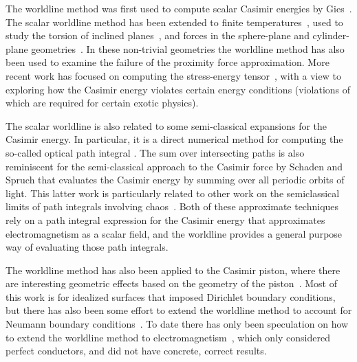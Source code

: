 The worldline method was first used to compute scalar Casimir energies by Gies\etal~\cite{Gies2003,Gies2006, Gies2006a}.
The scalar worldline method has been extended to finite temperatures~\cite{Klingmueller2008},
 used to study the torsion of inclined planes~\cite{Weber2009},
and forces in the sphere-plane and cylinder-plane geometries~\cite{Weber2010, Weber2010a}.  
In these non-trivial geometries the worldline method has also been used to examine the failure of the proximity force approximation.
More recent work has focused on computing the stress-energy tensor~\cite{Schafer2012, Schafer2016},
with a view to exploring how the Casimir energy violates certain energy conditions (violations of which are required for certain exotic physics).

The scalar worldline is also related to some semi-classical expansions for the Casimir energy.  
In particular, it is a direct numerical method for computing the so-called optical path integral
\cite{Scardicchio2005, Scardicchio2006}.  The sum over intersecting paths is also reminiscent 
for the semi-classical approach to the Casimir force by Schaden and Spruch\cite{Schaden1998} that evaluates 
the Casimir energy by summing over all periodic orbits of light.  This latter work is particularly 
related to other work on the semiclassical limits of path integrals involving chaos~\cite{Gutzwiller1990}.
Both of these approximate techniques rely on a path integral expression for the Casimir energy that approximates electromagnetism as a
scalar field, and the worldline provides a general purpose way of evaluating those path integrals.   

The worldline method has also been applied to the Casimir piston, where there are interesting geometric effects
based on the geometry of the piston~\cite{Schaden2009,Schaden2009a}.
Most of this work is for idealized surfaces that imposed Dirichlet boundary conditions, but 
there has also been some effort to extend the worldline method to account for Neumann boundary
conditions~\cite{Fosco2010}.  To date there has only been speculation on how to extend the 
worldline method to electromagnetism~\cite{Aehlig2011}, which only considered perfect conductors,
and did not have concrete, correct results.    



